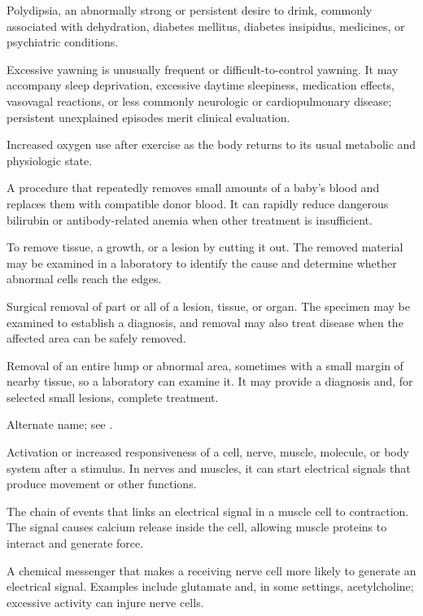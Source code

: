  Polydipsia, an abnormally strong or persistent desire to drink, commonly associated with dehydration, diabetes mellitus, diabetes insipidus, medicines, or psychiatric conditions.

 Excessive yawning is unusually frequent or difficult-to-control yawning. It may accompany sleep deprivation, excessive daytime sleepiness, medication effects, vasovagal reactions, or less commonly neurologic or cardiopulmonary disease; persistent unexplained episodes merit clinical evaluation.

 Increased oxygen use after exercise as the body returns to its usual metabolic and physiologic state.

 A procedure that repeatedly removes small amounts of a baby’s blood and replaces them with compatible donor blood. It can rapidly reduce dangerous bilirubin or antibody-related anemia when other treatment is insufficient.

 To remove tissue, a growth, or a lesion by cutting it out. The removed material may be examined in a laboratory to identify the cause and determine whether abnormal cells reach the edges.

 Surgical removal of part or all of a lesion, tissue, or organ. The specimen may be examined to establish a diagnosis, and removal may also treat disease when the affected area can be safely removed.

 Removal of an entire lump or abnormal area, sometimes with a small margin of nearby tissue, so a laboratory can examine it. It may provide a diagnosis and, for selected small lesions, complete treatment.

 Alternate name; see .

 Activation or increased responsiveness of a cell, nerve, muscle, molecule, or body system after a stimulus. In nerves and muscles, it can start electrical signals that produce movement or other functions.

 The chain of events that links an electrical signal in a muscle cell to contraction. The signal causes calcium release inside the cell, allowing muscle proteins to interact and generate force.

 A chemical messenger that makes a receiving nerve cell more likely to generate an electrical signal. Examples include glutamate and, in some settings, acetylcholine; excessive activity can injure nerve cells.

